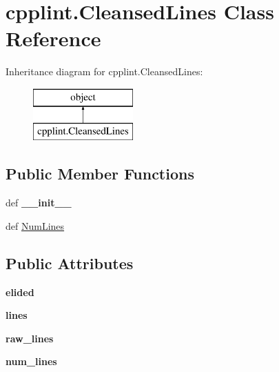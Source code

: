 \hypertarget{classcpplint_1_1CleansedLines}{\section{cpplint.\-Cleansed\-Lines Class Reference}
\label{classcpplint_1_1CleansedLines}
}
Inheritance diagram for cpplint.\-Cleansed\-Lines\-:\begin{figure}[H]
\begin{center}
\leavevmode
\includegraphics[height=2.000000cm]{classcpplint_1_1CleansedLines}
\end{center}
\end{figure}
\subsection*{Public Member Functions}
\begin{DoxyCompactItemize}
\item 
\hypertarget{classcpplint_1_1CleansedLines_a5be47afab0f6c15b446e3e8cba657266}{def {\bfseries \-\_\-\-\_\-init\-\_\-\-\_\-}}\label{classcpplint_1_1CleansedLines_a5be47afab0f6c15b446e3e8cba657266}

\item 
def \hyperlink{classcpplint_1_1CleansedLines_a768a3024ce576777a996121053404edd}{Num\-Lines}
\end{DoxyCompactItemize}
\subsection*{Public Attributes}
\begin{DoxyCompactItemize}
\item 
\hypertarget{classcpplint_1_1CleansedLines_aa4d0a4d5081675c01656a5d86d99e8bd}{{\bfseries elided}}\label{classcpplint_1_1CleansedLines_aa4d0a4d5081675c01656a5d86d99e8bd}

\item 
\hypertarget{classcpplint_1_1CleansedLines_a9cd74bd010da1610a46322d6821bd06a}{{\bfseries lines}}\label{classcpplint_1_1CleansedLines_a9cd74bd010da1610a46322d6821bd06a}

\item 
\hypertarget{classcpplint_1_1CleansedLines_a9e94ce9e4f682be33c04fe82429c4dfd}{{\bfseries raw\-\_\-lines}}\label{classcpplint_1_1CleansedLines_a9e94ce9e4f682be33c04fe82429c4dfd}

\item 
\hypertarget{classcpplint_1_1CleansedLines_a4b42ab48659954fb6e0a4e4eb483a45a}{{\bfseries num\-\_\-lines}}\label{classcpplint_1_1CleansedLines_a4b42ab48659954fb6e0a4e4eb483a45a}

\end{DoxyCompactItemize}



